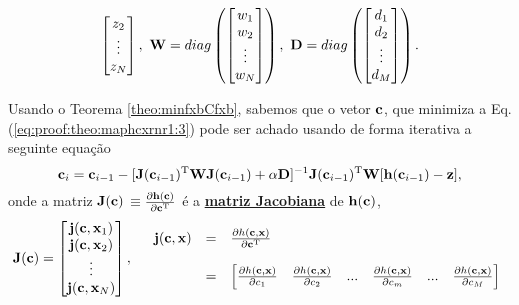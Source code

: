 \begin{myproofT}
\begin{equation}
\begin{bmatrix}
z_2\\ 
\vdots\\ 
z_N
\end{bmatrix},
~
\MATRIX{W}=\funcdiag\left(\begin{bmatrix}
w_1\\ 
w_2\\ 
\vdots\\ 
w_N
\end{bmatrix}\right),
~
\MATRIX{D}=\funcdiag\left(\begin{bmatrix}
d_1\\ 
d_2\\ 
\vdots\\ 
d_M
\end{bmatrix}\right).
\end{equation}

Usando o Teorema \ref{theo:minfxbCfxb}, sabemos que o vetor $\VECTOR{c}$,
que minimiza a Eq. (\ref{eq:proof:theo:maphcxrnr1:3}) pode ser achado usando 
de forma iterativa a seguinte equação
\begin{equation}\label{eq:proof:theo:maphcxrnr1:5}
\VECTOR{c}_{i}=\VECTOR{c}_{i-1}-[\MATRIX{J}(\VECTOR{c}_{i-1})^{\transpose}\MATRIX{W}\MATRIX{J}(\VECTOR{c}_{i-1})+\alpha \MATRIX{D}]^{-1}\MATRIX{J}(\VECTOR{c}_{i-1})^{\transpose}\MATRIX{W}[\VECTOR{h}(\VECTOR{c}_{i-1})-\VECTOR{z}],
\end{equation}
onde a matriz $\MATRIX{J}(\VECTOR{c})$ 
$\equiv \frac{\partial \VECTOR{h}(\VECTOR{c})}{\partial \VECTOR{c}^{\transpose}}$ é a 
\hyperref[def:jacobian]{\textbf{matriz Jacobiana}}  de $\VECTOR{h}(\VECTOR{c})$,
\begin{equation}
\MATRIX{J}(\VECTOR{c})=\begin{bmatrix}
\VECTOR{j}(\VECTOR{c},\VECTOR{x}_1)\\ 
\VECTOR{j}(\VECTOR{c},\VECTOR{x}_2)\\ 
\vdots\\ 
\VECTOR{j}(\VECTOR{c},\VECTOR{x}_N)
\end{bmatrix},
\quad
\begin{array}{lll}
\VECTOR{j}(\VECTOR{c},\VECTOR{x}) & = & \frac{\partial h(\VECTOR{c},\VECTOR{x})}{\partial \VECTOR{c}^{\transpose}} \\
                       ~ & ~ & ~\\
                       ~ & = & \left[\frac{\partial h(\VECTOR{c},\VECTOR{x})}{\partial c_1}\quad \frac{\partial h(\VECTOR{c},\VECTOR{x})}{\partial c_2}\quad ...\quad \frac{\partial h(\VECTOR{c},\VECTOR{x})}{\partial c_{m}} \quad ... \quad \frac{\partial h(\VECTOR{c},\VECTOR{x})}{\partial c_{M}} \right]
\end{array}
\end{equation}
\end{myproofT}


